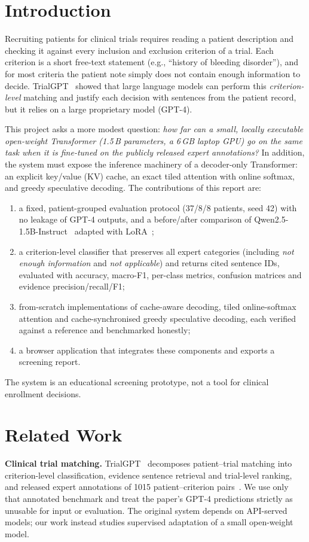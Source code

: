 \section{Introduction}
Recruiting patients for clinical trials requires reading a patient description and checking it against every inclusion and exclusion criterion of a trial. Each criterion is a short free-text statement (e.g., ``history of bleeding disorder''), and for most criteria the patient note simply does not contain enough information to decide. TrialGPT~\cite{jin2024trialgpt} showed that large language models can perform this \emph{criterion-level} matching and justify each decision with sentences from the patient record, but it relies on a large proprietary model (GPT-4).

This project asks a more modest question: \emph{how far can a small, locally executable open-weight Transformer (1.5\,B parameters, a 6\,GB laptop GPU) go on the same task when it is fine-tuned on the publicly released expert annotations?} In addition, the system must expose the inference machinery of a decoder-only Transformer: an explicit key/value (KV) cache, an exact tiled attention with online softmax, and greedy speculative decoding. The contributions of this report are:
\begin{enumerate}
\item a fixed, patient-grouped evaluation protocol (37/8/8 patients, seed 42) with no leakage of GPT-4 outputs, and a before/after comparison of Qwen2.5-1.5B-Instruct~\cite{qwen2024qwen25} adapted with LoRA~\cite{hu2022lora};
\item a criterion-level classifier that preserves all expert categories (including \emph{not enough information} and \emph{not applicable}) and returns cited sentence IDs, evaluated with accuracy, macro-F1, per-class metrics, confusion matrices and evidence precision/recall/F1;
\item from-scratch implementations of cache-aware decoding, tiled online-softmax attention and cache-synchronised greedy speculative decoding, each verified against a reference and benchmarked honestly;
\item a browser application that integrates these components and exports a screening report.
\end{enumerate}
The system is an educational screening prototype, not a tool for clinical enrollment decisions.

\section{Related Work}
\textbf{Clinical trial matching.} TrialGPT~\cite{jin2024trialgpt} decomposes patient--trial matching into criterion-level classification, evidence sentence retrieval and trial-level ranking, and released expert annotations of 1015 patient--criterion pairs~\cite{ncbi2024trialgptdata}. We use only that annotated benchmark and treat the paper's GPT-4 predictions strictly as unusable for input or evaluation. The original system depends on API-served models; our work instead studies supervised adaptation of a small open-weight model.

